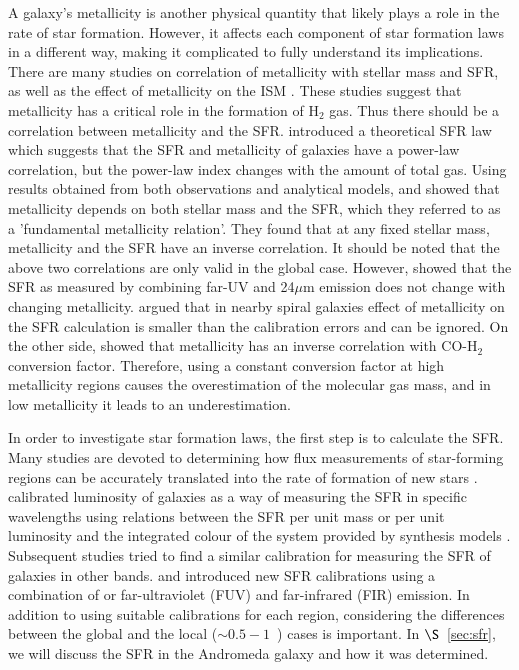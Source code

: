 A galaxy's metallicity is another physical quantity that likely plays a role in the rate of star formation. However, it affects each component of star formation laws in a different way, making it complicated to fully understand its implications. There are many studies on correlation of metallicity with stellar mass and SFR, as well as the effect of metallicity on the ISM \citep[e.g.][]{Boissier03, Leroy08, Krumholz09, Mannucci10, Dib11a, Lilly13}. These studies suggest that metallicity has a critical role in the formation of H$_2$ gas. Thus there should be a correlation between metallicity and the SFR. \citet{Krumholz09} introduced a theoretical SFR law which suggests that the SFR and metallicity of galaxies have a power-law correlation, but the power-law index changes with the amount of total gas. 
 Using results obtained from both observations and analytical models, \citet{Mannucci10} and \citet{Lilly13} showed that metallicity depends on both stellar mass and the SFR, which they referred to as a 'fundamental metallicity relation'. They found that at any fixed stellar mass, metallicity and the SFR have an inverse correlation. It should be noted that the above two correlations are only valid in the global case. However, \citet{Leroy08} showed that the SFR as measured by combining far-UV and 24$\mu$m emission does not change with changing metallicity. \citet{Roychowdhury15} argued that in nearby spiral galaxies effect of metallicity on the SFR calculation is smaller than the calibration errors and can be ignored. On the other side, \citet{Boissier03} showed that metallicity has an inverse correlation with CO-H$_2$ conversion factor. Therefore, using a constant conversion factor at high metallicity regions causes the overestimation of the molecular gas mass, and in low metallicity it leads to an underestimation.


In order to investigate star formation laws, the first step is to calculate the SFR. Many studies are devoted to determining how flux measurements of star-forming regions can be accurately translated into the rate of formation of new stars \citep[e.g.][]{Kennicutt12, Calzetti13, Zhu08, Kennicutt09, Boquien10, Boquien11, Hao11}. \citet{Kennicutt98b} calibrated luminosity of galaxies as a way of measuring the SFR in specific wavelengths using relations between the SFR per unit mass or per unit luminosity and the integrated colour of the system provided by synthesis models \citep[e.g.][]{Bruzual93}. Subsequent studies tried to find a similar calibration for measuring the SFR of galaxies in other bands. \citet{Kennicutt09} and \citet{Hao11} introduced new SFR calibrations using a combination of \halpha or far-ultraviolet (FUV) and far-infrared (FIR) emission. In addition to using suitable calibrations for each region, considering the differences between the global and the local ($\sim 0.5-1$~\kpc) cases is important. In $\S$~\ref{sec:sfr}, we will discuss the SFR in the Andromeda galaxy and how it was determined. 

